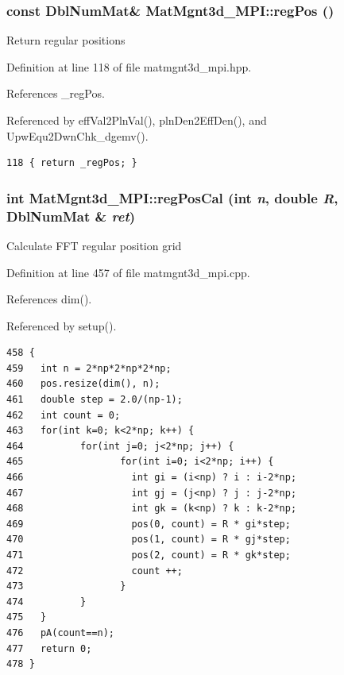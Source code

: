\subsubsection{\setlength{\rightskip}{0pt plus 5cm}const Dbl\-Num\-Mat\& Mat\-Mgnt3d\_\-MPI::reg\-Pos ()\hspace{0.3cm}{\tt  [inline]}}\label{classMatMgnt3d__MPI_3e4e5fb8bf4f06cf8295d32216124585_3e4e5fb8bf4f06cf8295d32216124585}


Return regular positions 

Definition at line 118 of file matmgnt3d\_\-mpi.hpp.

References \_\-reg\-Pos.

Referenced by eff\-Val2Pln\-Val(), pln\-Den2Eff\-Den(), and Upw\-Equ2Dwn\-Chk\_\-dgemv().

\footnotesize\begin{verbatim}118 { return _regPos; }
\end{verbatim}\normalsize 


\subsubsection{\setlength{\rightskip}{0pt plus 5cm}int Mat\-Mgnt3d\_\-MPI::reg\-Pos\-Cal (int {\em n}, double {\em R}, Dbl\-Num\-Mat \& {\em ret})}\label{classMatMgnt3d__MPI_4169f2bfee02545e9e3579c703129d1f_4169f2bfee02545e9e3579c703129d1f}


Calculate FFT regular position grid 

Definition at line 457 of file matmgnt3d\_\-mpi.cpp.

References dim().

Referenced by setup().

\footnotesize\begin{verbatim}458 {
459   int n = 2*np*2*np*2*np;
460   pos.resize(dim(), n);
461   double step = 2.0/(np-1);
462   int count = 0;
463   for(int k=0; k<2*np; k++) {
464          for(int j=0; j<2*np; j++) {
465                 for(int i=0; i<2*np; i++) {
466                   int gi = (i<np) ? i : i-2*np;
467                   int gj = (j<np) ? j : j-2*np;
468                   int gk = (k<np) ? k : k-2*np;
469                   pos(0, count) = R * gi*step;
470                   pos(1, count) = R * gj*step;
471                   pos(2, count) = R * gk*step;
472                   count ++;
473                 }
474          }
475   }
476   pA(count==n);
477   return 0;
478 }
\end{verbatim}\normalsize 


